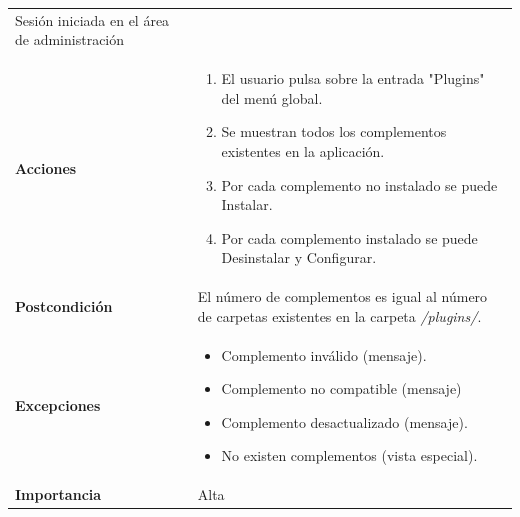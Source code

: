 \documentclass[
]{article}
\providecommand{\tightlist}{%
  \setlength{\itemsep}{0pt}\setlength{\parskip}{0pt}}
\begin{document}
\begin{longtable}[]{@{}ll@{}}
\begin{minipage}[t]{0.73\columnwidth}
Sesión iniciada en el área de administración\strut
\end{minipage}\tabularnewline
\begin{minipage}[t]{0.21\columnwidth}\raggedright
\textbf{Acciones}\strut
\end{minipage} & \begin{minipage}[t]{0.73\columnwidth}\raggedright
\begin{enumerate}
\def\labelenumi{\arabic{enumi}.}
\tightlist
\item
  El usuario pulsa sobre la entrada "Plugins" del menú global.
\item
  Se muestran todos los complementos existentes en la aplicación.
\item
  Por cada complemento no instalado se puede Instalar.
\item
  Por cada complemento instalado se puede Desinstalar y Configurar.
\end{enumerate}\strut
\end{minipage}\tabularnewline
\begin{minipage}[t]{0.21\columnwidth}\raggedright
\textbf{Postcondición}\strut
\end{minipage} & \begin{minipage}[t]{0.73\columnwidth}\raggedright
El número de complementos es igual al número de carpetas existentes en
la carpeta \emph{/plugins/}.\strut
\end{minipage}\tabularnewline
\begin{minipage}[t]{0.21\columnwidth}\raggedright
\textbf{Excepciones}\strut
\end{minipage} & \begin{minipage}[t]{0.73\columnwidth}\raggedright
\begin{itemize}
\tightlist
\item
  Complemento inválido (mensaje).
\item
  Complemento no compatible (mensaje)
\item
  Complemento desactualizado (mensaje).
\item
  No existen complementos (vista especial).
\end{itemize}\strut
\end{minipage}\tabularnewline
\begin{minipage}[t]{0.21\columnwidth}\raggedright
\textbf{Importancia}\strut
\end{minipage} & \begin{minipage}[t]{0.73\columnwidth}\raggedright
Alta\strut
\end{minipage}\tabularnewline
\bottomrule
\end{longtable}
\end{document}
